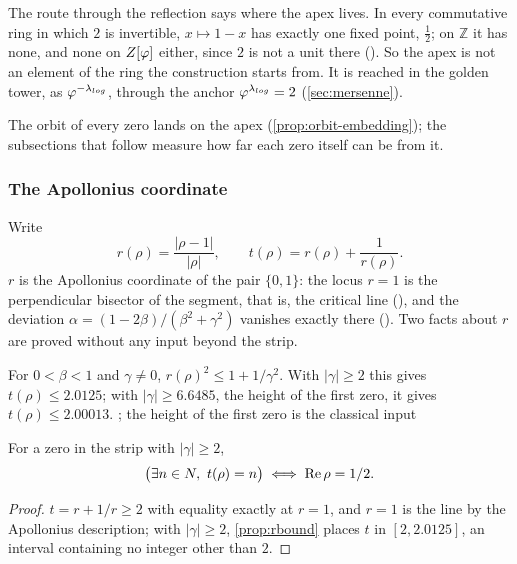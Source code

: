 The route through the reflection says where the apex lives.  In every commutative ring in which
$2$ is invertible, $x\mapsto1-x$ has exactly one fixed point, $\tfrac12$; on $\mathbb{Z}$ it has
none, and none on $Z[\varphi]$ either, since $2$ is not a unit there
().  So the apex is
not an element of the ring the construction starts from.  It is reached in the golden tower, as
$\varphi^{-\lambda_{log}}$, through the anchor $\varphi^{\lambda_{log}}=2$ (\cref{sec:mersenne}).

The orbit of every zero lands on the apex (\cref{prop:orbit-embedding}); the
subsections that follow measure how far each zero itself can be from it.

\subsubsection{The Apollonius coordinate}\label{ssec:apollonius}

Write
\[
  r(\rho)=\frac{|\rho-1|}{|\rho|},\qquad t(\rho)=r(\rho)+\frac1{r(\rho)} .
\]
$r$ is the Apollonius coordinate of the pair $\{0,1\}$: the locus $r=1$ is the
perpendicular bisector of the segment, that is, the critical line
(),
and the deviation $\alpha=(1-2\beta)/(\beta^2+\gamma^2)$ vanishes exactly there
().  Two facts about $r$ are proved
without any input beyond the strip.

\begin{proposition}\label{prop:rbound}
For $0<\beta<1$ and $\gamma\ne0$, $r(\rho)^2\le1+1/\gamma^2$.  With $|\gamma|\ge2$ this
gives $t(\rho)\le2.0125$; with $|\gamma|\ge6.6485$, the height of the first zero, it
gives $t(\rho)\le2.00013$.
; the height of the first zero is the classical
input 
\end{proposition}

\begin{proposition}\label{prop:integrality-is-E}
For a zero in the strip with $|\gamma|\ge2$,
\[
  \bigl(\exists n\in\N,\ t(\rho)=n\bigr)\iff\Re\rho=\tfrac12 .
\]
\leavevmode{}%
\end{proposition}
\begin{proof}
$t=r+1/r\ge2$ with equality exactly at $r=1$, and $r=1$ is the line by the
Apollonius description; with $|\gamma|\ge2$, \cref{prop:rbound} places $t$ in
$[2,2.0125]$, an interval containing no integer other than $2$.
\end{proof}

